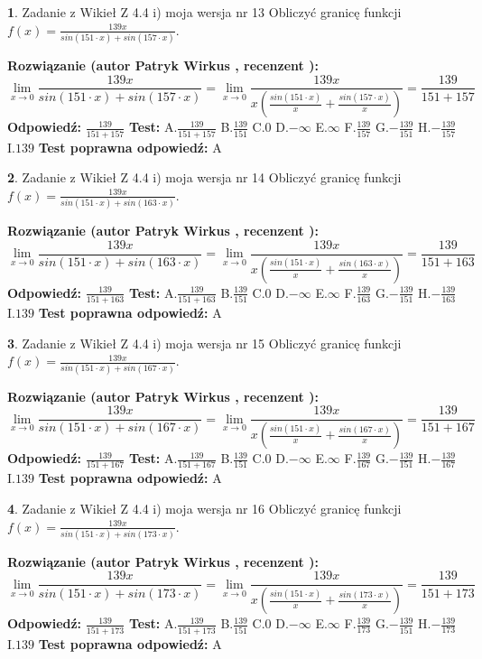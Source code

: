 \documentclass[12pt, a4paper]{article}
\theoremstyle{definition} %
\newtheorem{zad}{}
\newcommand{\zadStart}[1]{\begin{zad}#1\newline}
\newcommand{\zadStop}{\end{zad}}
\newcommand{\rozwStart}[2]{\noindent \textbf{Rozwiązanie (autor #1 , recenzent #2): }\newline}
\newcommand{\rozwStop}{\newline}
\newcommand{\odpStart}{\noindent \textbf{Odpowiedź:}\newline}
\newcommand{\odpStop}{\newline}
\newcommand{\testStart}{\noindent \textbf{Test:}\newline}
\newcommand{\testStop}{\newline}
\newcommand{\kluczStart}{\noindent \textbf{Test poprawna odpowiedź:}\newline}
\newcommand{\kluczStop}{\newline}
\begin{document}
\zadStart{Zadanie z Wikieł Z 4.4 i) moja wersja nr 13}
Obliczyć granicę funkcji $f(x)=\frac{139x}{sin(151\cdot x) +sin(157\cdot x)}$.
\zadStop
\rozwStart{Patryk Wirkus}{}
$$\lim\limits_{x\to 0}\frac{139x}{sin(151\cdot x) +sin(157\cdot x)}=\lim\limits_{x\to 0}\frac{139x}{x(\frac{sin(151\cdot x)}{x}+\frac{sin(157\cdot x)}{x})}=\frac{139}{151+157}$$
\rozwStop
\odpStart
$\frac{139}{151+157}$
\odpStop
\testStart
A.$\frac{139}{151+157}$
B.$\frac{139}{151}$
C.$0$
D.$-\infty$
E.$\infty$
F.$\frac{139}{157}$
G.$-\frac{139}{151}$
H.$-\frac{139}{157}$
I.$139$
\testStop
\kluczStart
A
\kluczStop



\zadStart{Zadanie z Wikieł Z 4.4 i) moja wersja nr 14}
Obliczyć granicę funkcji $f(x)=\frac{139x}{sin(151\cdot x) +sin(163\cdot x)}$.
\zadStop
\rozwStart{Patryk Wirkus}{}
$$\lim\limits_{x\to 0}\frac{139x}{sin(151\cdot x) +sin(163\cdot x)}=\lim\limits_{x\to 0}\frac{139x}{x(\frac{sin(151\cdot x)}{x}+\frac{sin(163\cdot x)}{x})}=\frac{139}{151+163}$$
\rozwStop
\odpStart
$\frac{139}{151+163}$
\odpStop
\testStart
A.$\frac{139}{151+163}$
B.$\frac{139}{151}$
C.$0$
D.$-\infty$
E.$\infty$
F.$\frac{139}{163}$
G.$-\frac{139}{151}$
H.$-\frac{139}{163}$
I.$139$
\testStop
\kluczStart
A
\kluczStop



\zadStart{Zadanie z Wikieł Z 4.4 i) moja wersja nr 15}
Obliczyć granicę funkcji $f(x)=\frac{139x}{sin(151\cdot x) +sin(167\cdot x)}$.
\zadStop
\rozwStart{Patryk Wirkus}{}
$$\lim\limits_{x\to 0}\frac{139x}{sin(151\cdot x) +sin(167\cdot x)}=\lim\limits_{x\to 0}\frac{139x}{x(\frac{sin(151\cdot x)}{x}+\frac{sin(167\cdot x)}{x})}=\frac{139}{151+167}$$
\rozwStop
\odpStart
$\frac{139}{151+167}$
\odpStop
\testStart
A.$\frac{139}{151+167}$
B.$\frac{139}{151}$
C.$0$
D.$-\infty$
E.$\infty$
F.$\frac{139}{167}$
G.$-\frac{139}{151}$
H.$-\frac{139}{167}$
I.$139$
\testStop
\kluczStart
A
\kluczStop



\zadStart{Zadanie z Wikieł Z 4.4 i) moja wersja nr 16}
Obliczyć granicę funkcji $f(x)=\frac{139x}{sin(151\cdot x) +sin(173\cdot x)}$.
\zadStop
\rozwStart{Patryk Wirkus}{}
$$\lim\limits_{x\to 0}\frac{139x}{sin(151\cdot x) +sin(173\cdot x)}=\lim\limits_{x\to 0}\frac{139x}{x(\frac{sin(151\cdot x)}{x}+\frac{sin(173\cdot x)}{x})}=\frac{139}{151+173}$$
\rozwStop
\odpStart
$\frac{139}{151+173}$
\odpStop
\testStart
A.$\frac{139}{151+173}$
B.$\frac{139}{151}$
C.$0$
D.$-\infty$
E.$\infty$
F.$\frac{139}{173}$
G.$-\frac{139}{151}$
H.$-\frac{139}{173}$
I.$139$
\testStop
\kluczStart
A
\kluczStop
\end{document}
